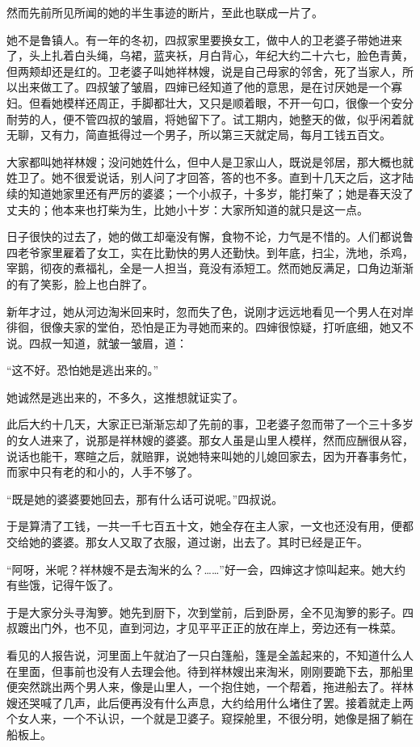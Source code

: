 \par 然而先前所见所闻的她的半生事迹的断片，至此也联成一片了。
\par 她不是鲁镇人。有一年的冬初，四叔家里要换女工，做中人的卫老婆子带她进来了，头上扎着白头绳，乌裙，蓝夹袄，月白背心，年纪大约二十六七，脸色青黄，但两颊却还是红的。卫老婆子叫她祥林嫂，说是自己母家的邻舍，死了当家人，所以出来做工了。四叔皱了皱眉，四婶已经知道了他的意思，是在讨厌她是一个寡妇。但看她模样还周正，手脚都壮大，又只是顺着眼，不开一句口，很像一个安分耐劳的人，便不管四叔的皱眉，将她留下了。试工期内，她整天的做，似乎闲着就无聊，又有力，简直抵得过一个男子，所以第三天就定局，每月工钱五百文。
\par 大家都叫她祥林嫂；没问她姓什么，但中人是卫家山人，既说是邻居，那大概也就姓卫了。她不很爱说话，别人问了才回答，答的也不多。直到十几天之后，这才陆续的知道她家里还有严厉的婆婆；一个小叔子，十多岁，能打柴了；她是春天没了丈夫的；他本来也打柴为生，比她小十岁：大家所知道的就只是这一点。
\par 日子很快的过去了，她的做工却毫没有懈，食物不论，力气是不惜的。人们都说鲁四老爷家里雇着了女工，实在比勤快的男人还勤快。到年底，扫尘，洗地，杀鸡，宰鹅，彻夜的煮福礼，全是一人担当，竟没有添短工。然而她反满足，口角边渐渐的有了笑影，脸上也白胖了。
\par 新年才过，她从河边淘米回来时，忽而失了色，说刚才远远地看见一个男人在对岸徘徊，很像夫家的堂伯，恐怕是正为寻她而来的。四婶很惊疑，打听底细，她又不说。四叔一知道，就皱一皱眉，道：
\par “这不好。恐怕她是逃出来的。”
\par 她诚然是逃出来的，不多久，这推想就证实了。
\par 此后大约十几天，大家正已渐渐忘却了先前的事，卫老婆子忽而带了一个三十多岁的女人进来了，说那是祥林嫂的婆婆。那女人虽是山里人模样，然而应酬很从容，说话也能干，寒暄之后，就赔罪，说她特来叫她的儿媳回家去，因为开春事务忙，而家中只有老的和小的，人手不够了。
\par “既是她的婆婆要她回去，那有什么话可说呢。”四叔说。
\par 于是算清了工钱，一共一千七百五十文，她全存在主人家，一文也还没有用，便都交给她的婆婆。那女人又取了衣服，道过谢，出去了。其时已经是正午。
\par “阿呀，米呢？祥林嫂不是去淘米的么？……”好一会，四婶这才惊叫起来。她大约有些饿，记得午饭了。
\par 于是大家分头寻淘箩。她先到厨下，次到堂前，后到卧房，全不见淘箩的影子。四叔踱出门外，也不见，直到河边，才见平平正正的放在岸上，旁边还有一株菜。
\par 看见的人报告说，河里面上午就泊了一只白篷船，篷是全盖起来的，不知道什么人在里面，但事前也没有人去理会他。待到祥林嫂出来淘米，刚刚要跪下去，那船里便突然跳出两个男人来，像是山里人，一个抱住她，一个帮着，拖进船去了。祥林嫂还哭喊了几声，此后便再没有什么声息，大约给用什么堵住了罢。接着就走上两个女人来，一个不认识，一个就是卫婆子。窥探舱里，不很分明，她像是捆了躺在船板上。
